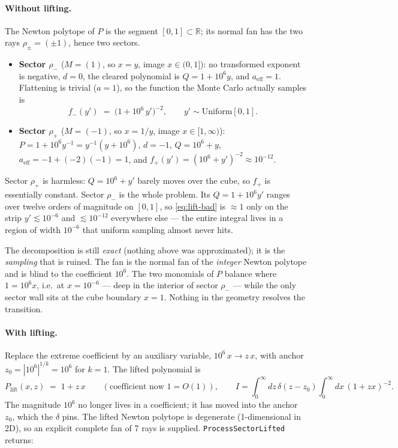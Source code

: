 \documentclass[11pt,a4paper]{article}
\begin{document}
\paragraph{Without lifting.} The Newton polytope of $P$ is the segment
$[0,1]\subset\mathbb{R}$; its normal fan has the two rays $\rho_\pm = (\pm 1)$,
hence two sectors.
\begin{itemize}
  \item \textbf{Sector $\rho_-$} ($M=(1)$, so $x=y$, image $x\in(0,1]$): no
    transformed exponent is negative, $d=0$, the cleared polynomial is
    $Q = 1 + 10^6 y$, and $a_{\mathrm{eff}}=1$. Flattening is trivial
    ($a=1$), so the function the Monte Carlo actually samples is
    \begin{equation}\label{eq:lift-bad}
    f_-(y') \;=\; \bigl(1 + 10^6\,y'\bigr)^{-2}, \qquad
    y'\sim\mathrm{Uniform}[0,1].
    \end{equation}
  \item \textbf{Sector $\rho_+$} ($M=(-1)$, so $x=1/y$, image
    $x\in[1,\infty)$): $P = 1 + 10^6 y^{-1} = y^{-1}(y + 10^6)$, $d=-1$,
    $Q = 10^6 + y$, $a_{\mathrm{eff}} = -1 + (-2)(-1) = 1$, and
    $f_+(y') = (10^6 + y')^{-2}\approx 10^{-12}$.
\end{itemize}
Sector $\rho_+$ is harmless: $Q = 10^6 + y'$ barely moves over the cube, so
$f_+$ is essentially constant. Sector $\rho_-$ is the whole problem. Its
$Q = 1 + 10^6 y'$ ranges over twelve orders of magnitude on $[0,1]$, so
\eqref{eq:lift-bad} is $\approx 1$ only on the strip $y'\lesssim 10^{-6}$ and
$\lesssim 10^{-12}$ everywhere else --- the entire integral lives in a region
of width $10^{-6}$ that uniform sampling almost never hits.

The decomposition is still \emph{exact} (nothing above was approximated); it is
the \emph{sampling} that is ruined. The fan is the normal fan of the
\emph{integer} Newton polytope and is blind to the coefficient $10^6$. The two
monomials of $P$ balance where $1 = 10^6 x$, i.e.\ at $x = 10^{-6}$ --- deep in
the interior of sector $\rho_-$ --- while the only sector wall sits at the cube
boundary $x=1$. Nothing in the geometry resolves the transition.

\paragraph{With lifting.} Replace the extreme coefficient by an auxiliary
variable, $10^6\,x \to z\,x$, with anchor $z_0 = |10^6|^{1/k} = 10^6$ for $k=1$.
The lifted polynomial is
\begin{equation}
P_{\mathrm{lift}}(x,z) \;=\; 1 + z\,x \qquad(\text{coefficient now } 1 = O(1)),
\qquad
I = \int_0^\infty\! dz\,\delta(z-z_0)\!\int_0^\infty\! dx\,(1+zx)^{-2}.
\end{equation}
The magnitude $10^6$ no longer lives in a coefficient; it has moved into the
anchor $z_0$, which the $\delta$ pins. The lifted Newton polytope is degenerate
(1-dimensional in 2D), so an explicit complete fan of 7 rays is supplied.
\texttt{ProcessSectorLifted} returns:
\end{document}
